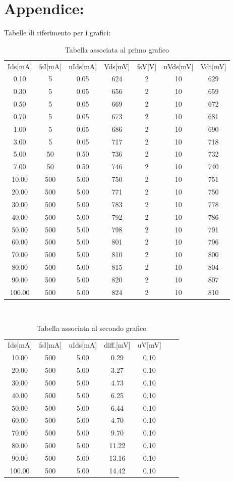 \documentclass{article}
\begin{document}
\section{Appendice:}
Tabelle di riferimento per i grafici:
~
\begin{table}[h!]
  \begin{center}
   \begin{tabular}{|c|c|c|c|c|c|c|}
      Ids[mA]&fsI[mA]&uIds[mA]&Vds[mV]&fsV[V]&uVds[mV]&Vdt[mV] \\
      0.10&5&0.05&624&2&10&629\\
      0.30&5&0.05&656&2&10&659\\
      0.50&5&0.05&669&2&10&672\\
      0.70&5&0.05&673&2&10&681\\
      1.00&5&0.05&686&2&10&690\\
      3.00&5&0.05&717&2&10&718\\
      5.00&50&0.50&736&2&10&732\\
      7.00&50&0.50&746&2&10&740\\
      10.00&500&5.00&750&2&10&751\\
      20.00&500&5.00&771&2&10&750\\
      30.00&500&5.00&783&2&10&778\\
      40.00&500&5.00&792&2&10&786\\
      50.00&500&5.00&798&2&10&791\\
      60.00&500&5.00&801&2&10&796\\
      70.00&500&5.00&810&2&10&800\\
      80.00&500&5.00&815&2&10&804\\
      90.00&500&5.00&820&2&10&807\\
      100.00&500&5.00&824&2&10&810
       \end{tabular}
  \caption{Tabella associata al primo grafico}
  \end{center}
\end{table} 
~
\begin{table}[h!]
  \begin{center}
   \begin{tabular}{|c|c|c|c|c|c|c|}
      Ids[mA]&fsI[mA]&uIds[mA]&diff.[mV]&uV[mV]\\
      10.00&500&5.00&0.29&0.10\\
      20.00&500&5.00&3.27&0.10\\
      30.00&500&5.00&4.73&0.10\\
      40.00&500&5.00&6.25&0.10\\
      50.00&500&5.00&6.44&0.10\\
      60.00&500&5.00&4.70&0.10\\
      70.00&500&5.00&9.70&0.10\\
      80.00&500&5.00&11.22&0.10\\
      90.00&500&5.00&13.16&0.10\\
      100.00&500&5.00&14.42&0.10
       \end{tabular}
  \caption{Tabella associata al secondo grafico}
  \end{center}
\end{table} 
\end{document}
